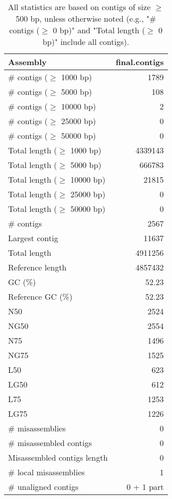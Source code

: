 \documentclass[12pt,a4paper]{article}
\begin{document}
\begin{table}[ht]
\begin{center}
\caption{All statistics are based on contigs of size $\geq$ 500 bp, unless otherwise noted (e.g., "\# contigs ($\geq$ 0 bp)" and "Total length ($\geq$ 0 bp)" include all contigs).}
\begin{tabular}{|l*{1}{|r}|}
\hline
Assembly & final.contigs \\ \hline
\# contigs ($\geq$ 1000 bp) & 1789 \\ \hline
\# contigs ($\geq$ 5000 bp) & 108 \\ \hline
\# contigs ($\geq$ 10000 bp) & 2 \\ \hline
\# contigs ($\geq$ 25000 bp) & 0 \\ \hline
\# contigs ($\geq$ 50000 bp) & 0 \\ \hline
Total length ($\geq$ 1000 bp) & 4339143 \\ \hline
Total length ($\geq$ 5000 bp) & 666783 \\ \hline
Total length ($\geq$ 10000 bp) & 21815 \\ \hline
Total length ($\geq$ 25000 bp) & 0 \\ \hline
Total length ($\geq$ 50000 bp) & 0 \\ \hline
\# contigs & 2567 \\ \hline
Largest contig & 11637 \\ \hline
Total length & 4911256 \\ \hline
Reference length & 4857432 \\ \hline
GC (\%) & 52.23 \\ \hline
Reference GC (\%) & 52.23 \\ \hline
N50 & 2524 \\ \hline
NG50 & 2554 \\ \hline
N75 & 1496 \\ \hline
NG75 & 1525 \\ \hline
L50 & 623 \\ \hline
LG50 & 612 \\ \hline
L75 & 1253 \\ \hline
LG75 & 1226 \\ \hline
\# misassemblies & 0 \\ \hline
\# misassembled contigs & 0 \\ \hline
Misassembled contigs length & 0 \\ \hline
\# local misassemblies & 1 \\ \hline
\# unaligned contigs & 0 + 1 part \\ \hline

\end{tabular}
\end{center}
\end{table}
\end{document}
